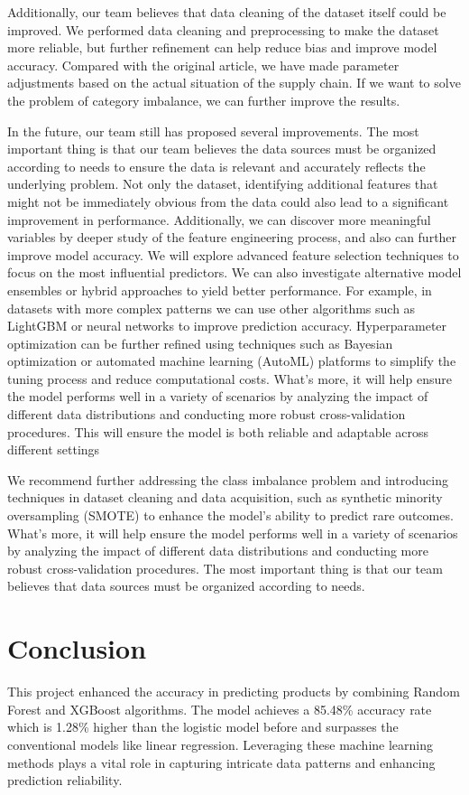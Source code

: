 \documentclass[conference]{IEEEtran}
\begin{document}
Additionally, our team believes that data cleaning of the dataset itself could be improved. We performed data cleaning and preprocessing to make the dataset more reliable, but further refinement can help reduce bias and improve model accuracy. Compared with the original article, we have made parameter adjustments based on the actual situation of the supply chain. If we want to solve the problem of category imbalance, we can further improve the results. 

In the future, our team still has proposed several improvements. The most important thing is that our team believes the data sources must be organized according to needs to ensure the data is relevant and accurately reflects the underlying problem. Not only the dataset, identifying additional features that might not be immediately obvious from the data could also lead to a significant improvement in performance. Additionally, we can discover more meaningful variables by deeper study of the feature engineering process, and also can further improve model accuracy. We will explore advanced feature selection techniques to focus on the most influential predictors. We can also investigate alternative model ensembles or hybrid approaches to yield better performance. For example, in datasets with more complex patterns we can use other algorithms such as LightGBM or neural networks to improve prediction accuracy. Hyperparameter optimization can be further refined using techniques such as Bayesian optimization or automated machine learning (AutoML) platforms to simplify the tuning process and reduce computational costs. What's more, it will help ensure the model performs well in a variety of scenarios by analyzing the impact of different data distributions and conducting more robust cross-validation procedures. This will ensure the model is both reliable and adaptable across different settings

We recommend further addressing the class imbalance problem and introducing techniques in dataset cleaning and data acquisition, such as synthetic minority oversampling (SMOTE) to enhance the model's ability to predict rare outcomes. What's more, it will help ensure the model performs well in a variety of scenarios by analyzing the impact of different data distributions and conducting more robust cross-validation procedures. The most important thing is that our team believes that data sources must be organized according to needs.


\section{Conclusion}
This project enhanced the accuracy in predicting products by combining Random Forest and XGBoost algorithms. The model achieves a 85.48\% accuracy rate which is 1.28\% higher than the logistic model before and surpasses the conventional models like linear regression. Leveraging these machine learning methods plays a vital role in capturing intricate data patterns and enhancing prediction reliability.
\end{document}
